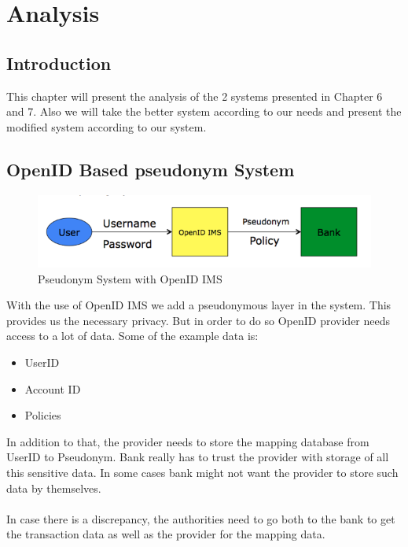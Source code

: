 \chapter{Analysis}
\section{Introduction}
This chapter will present the analysis of the 2 systems presented in Chapter 6 and 7. Also we will take the better system according to our needs and present the modified system according to our system.
\section{OpenID Based pseudonym System}
\begin{figure}[h]
	\centering
	\includegraphics[width=\textwidth]{figures/OpenID}
	\caption{Pseudonym System with OpenID IMS}
	\label{fig:OpenID}
\end{figure}
With the use of OpenID IMS we add a pseudonymous layer in the system. This provides us the necessary privacy. But in order to do so OpenID provider needs access to a lot of data. Some of the example data is:
\begin{itemize}
\item UserID
\item Account ID 
\item Policies	
\end{itemize}
In addition to that, the provider needs to store the mapping database from UserID to Pseudonym. Bank really has to trust the provider with storage of all this sensitive data. In some cases bank might not want the provider to store such data by themselves.
\\
\\In case there is a discrepancy, the authorities need to go both to the bank to get the transaction data as well as the provider for the mapping data.
